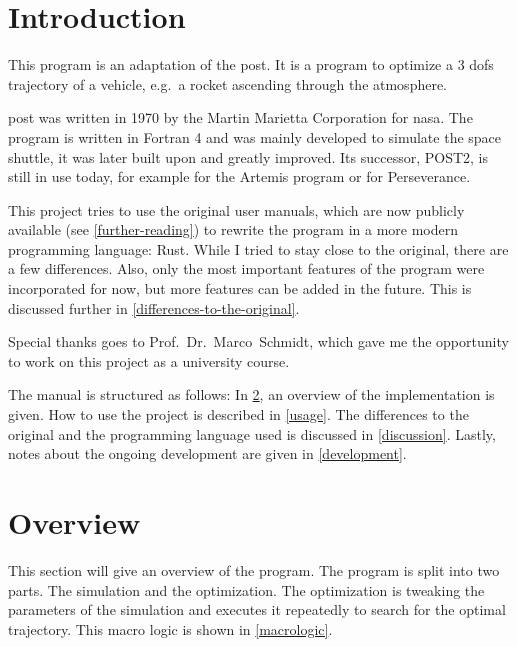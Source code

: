 \section{Introduction}\label{introduction}

This program is an adaptation of the \gls{post}. It is a program to optimize a 3
\glspl{dof} trajectory of a vehicle, e.g.~a rocket ascending through the
atmosphere.

\gls{post} was written in 1970 by the Martin Marietta Corporation for \gls{nasa}. The program is written in Fortran 4 and was mainly developed to
simulate the space shuttle, it was later built upon and greatly improved\cite{PostHistory}. Its successor, POST2, is still in use today, for example
for the Artemis program or for Perseverance\cite{PostApp}.

This project tries to use the original user manuals, which are now publicly
available (see \cref{further-reading}) to rewrite the program in a more modern programming
language: Rust. While I tried to stay close to the original, there are a few
differences. Also, only the most important features of the program were
incorporated for now, but more features can be added in the future. This is
discussed further in \cref{differences-to-the-original}.

Special thanks goes to Prof.~Dr.~Marco~Schmidt, which gave me the opportunity
to work on this project as a university course.

The manual is structured as follows: In \cref{overview}, an overview of the implementation is given. How to use the
project is described in \cref{usage}. The differences to the original and the programming language used
is discussed in \cref{discussion}. Lastly, notes about the ongoing development are given in \cref{development}.

\section{Overview}\label{overview}

This section will give an overview of the program. The program is split into
two parts. The simulation and the optimization. The optimization is tweaking
the parameters of the simulation and executes it repeatedly to search for the
optimal trajectory. This macro logic is shown in \cref{macrologic}.

